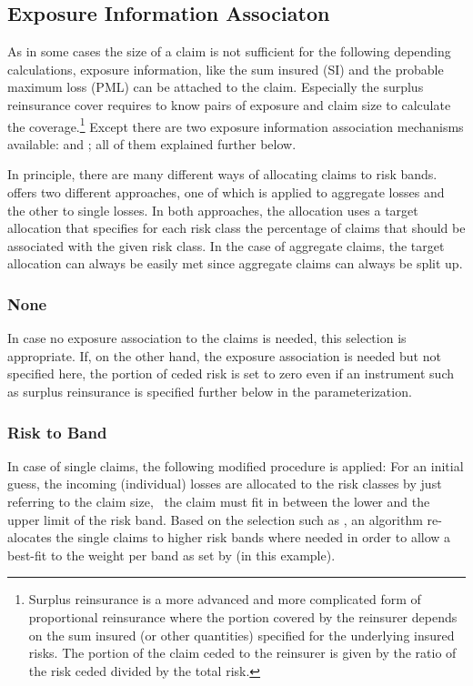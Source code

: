 \subsection{Exposure Information Associaton} 
\label{subsec:Exposure Information Associaton}
As in some cases the size of a claim is not sufficient for the following depending calculations, exposure information, like the sum insured (SI) and the probable maximum loss (PML) can be attached to the claim. Especially the surplus reinsurance cover requires to know pairs of exposure and claim size to calculate the coverage.\footnote{Surplus reinsurance is a more advanced and more complicated form of proportional reinsurance where the portion covered by the reinsurer depends on the sum insured (or other quantities) specified for the underlying insured risks. The portion of the claim ceded to the
reinsurer is given by the ratio of the risk ceded divided by the total risk.} Except  there are two exposure information association mechanisms available:  and ; all of them explained further below. 

In principle, there are many different ways of allocating claims to risk bands. \RiskAnalytics{} offers two different approaches, one of which is applied
to aggregate losses and the other to single losses. In both approaches, the allocation uses a target allocation that specifies for each risk class the percentage of claims that should be associated with the
given risk class. In the case of aggregate claims, the target allocation can always be easily met since aggregate claims can always be split up. 

\subsubsection*{None}
In case no exposure association to the claims is needed, this selection is appropriate. If, on the other hand, the exposure association is needed but not specified here, the portion of ceded risk is set to zero even if an instrument such as surplus reinsurance is specified further below in the parameterization. 

\subsubsection*{Risk to Band}
\label{subsubsec:riskToBand}

In case of single claims, the following modified procedure is applied: For an initial guess, the incoming (individual) losses are allocated to the risk
classes by just referring to the claim size, \ie~the claim must fit in between the lower and the upper limit of the risk band. Based on the selection such as , an algorithm re-alocates the single claims to higher risk bands where needed in order to allow a best-fit to the weight per band as set by  (in this example).

